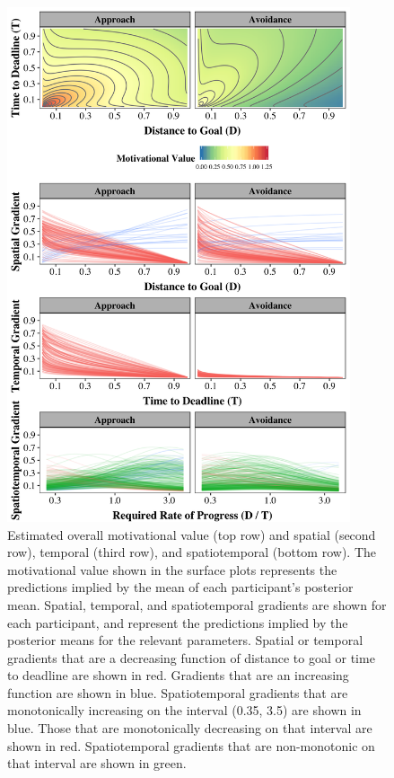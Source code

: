 \documentclass[a4paper,doc,natbib,donotrepeattitle]{apa6}
\begin{document}
\begin{figure}[h!]
\centering
\includegraphics[width=0.9\textwidth]{overall_motivation.png}
\caption{\label{fig:gradients} Estimated overall motivational value (top row) and spatial (second row), temporal (third row), and spatiotemporal (bottom row). The motivational value shown in the surface plots represents the predictions implied by the mean of each participant's posterior mean. Spatial, temporal, and spatiotemporal gradients are shown for each participant, and represent the predictions implied by the posterior means for the relevant parameters. Spatial or temporal gradients that are a decreasing function of distance to goal or time to deadline are shown in red. Gradients that are an increasing function are shown in blue. Spatiotemporal gradients that are monotonically increasing on the interval (0.35, 3.5) are shown in blue. Those that are monotonically decreasing on that interval are shown in red. Spatiotemporal gradients that are non-monotonic on that interval are shown in green.}
\end{figure}
\end{document}
